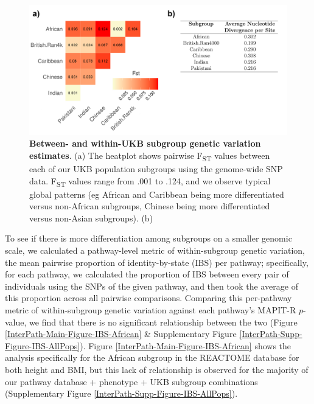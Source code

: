 \documentclass[12pt,a4paper]{article}
\begin{document}
\begin{figure}[htb]
\centering
\hspace*{-1cm}
\includegraphics[scale=.5]{Images/Main/InterPath_Main_Figure_Fst_vs3.png}
\caption[TBD]{\textbf{Between- and within-UKB subgroup genetic variation estimates}. (a) The heatplot shows pairwise F\textsubscript{ST} values between each of our UKB population subgroups using the genome-wide SNP data. F\textsubscript{ST} values range from .001 to .124, and we observe typical global patterns (eg African and Caribbean being more differentiated versus non-African subgroups, Chinese being more differentiated versus non-Asian subgroups). (b) }
\label{InterPath-Main-Figure-Fst}
\end{figure}


To see if there is more differentiation among subgroups on a smaller genomic scale, we calculated a pathway-level metric of within-subgroup genetic variation, the mean pairwise proportion of identity-by-state (IBS) per pathway; specifically, for each pathway, we calculated the proportion of IBS between every pair of individuals using the SNPs of the given pathway, and then took the average of this proportion across all pairwise comparisons.  Comparing this per-pathway metric of within-subgroup genetic variation against each pathway's MAPIT-R $p$-value, we find that there is no significant relationship between the two (Figure \ref{InterPath-Main-Figure-IBS-African} \& Supplementary Figure \ref{InterPath-Supp-Figure-IBS-AllPops}). Figure \ref{InterPath-Main-Figure-IBS-African} shows the analysis specifically for the African subgroup in the REACTOME database for both height and BMI, but this lack of relationship is observed for the majority of our pathway database + phenotype + UKB subgroup combinations (Supplementary Figure \ref{InterPath-Supp-Figure-IBS-AllPops}). 
\end{document}
